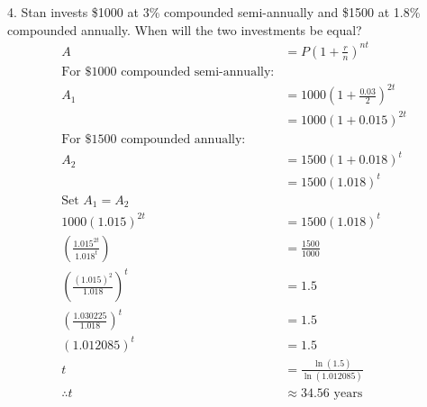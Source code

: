 \documentclass{article}
\newenvironment{solution}{\color{solutioncolor}}{}
\begin{document}
\begin{enumerate}
\begin{solution}
    \end{solution}
\end{enumerate}

4. Stan invests \$1000 at 3\% compounded semi-annually and \$1500 at 1.8\% compounded annually. When will the two investments be equal?
\begin{solution}
    \begin{align*}
        A &= P\left(1 + \frac{r}{n}\right)^{nt} \\
        \text{For } \$1000 \text{ compounded semi-annually:} \\
        A_1 &= 1000\left(1 + \frac{0.03}{2}\right)^{2t} \\
        &= 1000\left(1 + 0.015\right)^{2t} \\
        \text{For } \$1500 \text{ compounded annually:} \\
        A_2 &= 1500\left(1 + 0.018\right)^t \\
        &= 1500(1.018)^t \\
        \text{Set } A_1 = A_2 \\
        1000(1.015)^{2t} &= 1500(1.018)^t \\
        \left(\frac{1.015^{2t}}{1.018^t}\right) &= \frac{1500}{1000} \\
        \left(\frac{(1.015)^2}{1.018}\right)^t &= 1.5 \\
        \left(\frac{1.030225}{1.018}\right)^t &= 1.5 \\
        (1.012085)^t &= 1.5 \\
        t &= \frac{\ln(1.5)}{\ln(1.012085)} \\
        \therefore t &\approx 34.56 \text{ years}
    \end{align*}
\end{solution}
\end{document}
